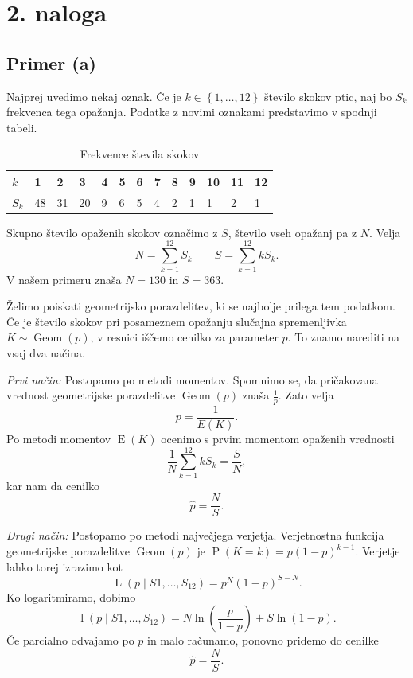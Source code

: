 \documentclass[a4paper,11pt]{article}
\newcommand{\set}[1]{\left\{#1\right\}} %
\DeclareMathOperator{\E}{E}
\DeclareMathOperator{\PP}{P}
\DeclareMathOperator{\Geom}{Geom}
\DeclareMathOperator{\Lver}{L}
\DeclareMathOperator{\lver}{l}
\begin{document}

\section*{2. naloga}

\subsection*{Primer (a)}

Najprej uvedimo nekaj oznak. 
Če je $k \in \set{1, \ldots, 12}$ število skokov ptic, naj bo $S_k$ frekvenca tega opažanja.
Podatke z novimi oznakami predstavimo v spodnji tabeli.
\begin{table}[H]
    \centering
    \begin{tabular}{|l|l|l|l|l|l|l|l|l|l|l|l|l|}
    \hline
    $k$ & 1 & 2 & 3 & 4 & 5 & 6 & 7 & 8 & 9 & 10 & 11 & 12 \\ \hline
    $S_k$ & 48 & 31 & 20 & 9 & 6 & 5 & 4 & 2 & 1 & 1 & 2 & 1 \\ \hline
    \end{tabular}
    \caption{Frekvence števila skokov}
    \label{freq}
\end{table}
Skupno število opaženih skokov označimo z $S$, število vseh opažanj pa z $N$.
Velja
\[N = \sum_{k=1}^{12} S_k \qquad S = \sum_{k=1}^{12} k S_k.\]
V našem primeru znaša $N = 130$ in $S = 363$.

Želimo poiskati geometrijsko porazdelitev, ki se najbolje prilega tem podatkom. 
Če je število skokov pri posameznem opažanju slučajna spremenljivka $K \sim \Geom(p)$, 
v resnici iščemo cenilko za parameter $p$.
To znamo narediti na vsaj dva načina.

\emph{Prvi način:} Postopamo po metodi momentov. 
Spomnimo se, da pričakovana vrednost geometrijske porazdelitve $\Geom(p)$ znaša $\frac{1}{p}$.
Zato velja
\[p = \frac{1}{E(K)}.\]
Po metodi momentov $\E(K)$ ocenimo s prvim momentom opaženih vrednosti 
\[\frac{1}{N} \sum_{k=1}^{12} k S_k = \frac{S}{N},\]
kar nam da cenilko
\[\hat{p} = \frac{N}{S}.\]

\emph{Drugi način:} Postopamo po metodi največjega verjetja.
Verjetnostna funkcija geometrijske porazdelitve $\Geom(p)$ je $\PP(K=k) = p(1-p)^{k-1}$.
Verjetje lahko torej izrazimo kot 
\[\Lver(p \mid S1, \ldots, S_{12}) = p^N (1-p)^{S - N}.\]
Ko logaritmiramo, dobimo 
\[\lver(p \mid S1, \ldots, S_{12}) = N \ln(\frac{p}{1-p}) + S \ln(1-p).\]
Če parcialno odvajamo po $p$ in malo računamo, ponovno pridemo do cenilke
\[\hat{p} = \frac{N}{S}.\]
\end{document}
